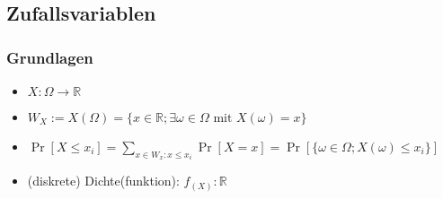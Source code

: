\subsection{Zufallsvariablen}

\subsubsection{Grundlagen}
\begin{itemize}
\item $X:\Omega\rightarrow\mathbb{R}$
\item $W_X:=X(\Omega)=\{x\in\mathbb{R};\exists\omega\in\Omega\text{ mit } X(\omega)=x\}$
\item $\Pr[X\leq x_i]=\sum_{x\in W_x:x\leq x_i}\Pr[X=x]=\Pr[\{\omega\in\Omega ;X(\omega)\leq x_i\}]$
\item (diskrete) Dichte(funktion): $f_{(X)}:\mathbb{R}$
\end{itemize}


